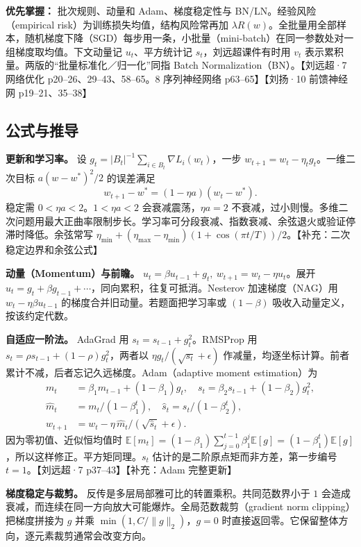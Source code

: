 \documentclass[UTF8,a4paper,zihao=-4,fontset=fandol]{ctexart}
\begin{document}
\textbf{优先掌握：} 批次规则、动量和 Adam、梯度稳定性与 BN/LN。经验风险（empirical risk）为训练损失均值，结构风险常再加 $\lambda R(w)$。全批量用全部样本，随机梯度下降（SGD）每步用一条，小批量（mini-batch）在同一参数处对一组梯度取均值。下文动量记 $u_t$、平方统计记 $s_t$，刘远超课件有时用 $v_t$ 表示累积量。两版的“批量标准化／归一化”同指 Batch Normalization（BN）。【刘远超·7 网络优化 p20--26、29--43、58--65。8 序列神经网络 p63--65】【刘扬·10 前馈神经网 p19--21、35--38】

\subsection{公式与推导}

\textbf{更新和学习率。} 设 $g_t=|B_t|^{-1}\sum_{i\in B_t}\nabla L_i(w_t)$，一步 $w_{t+1}=w_t-\eta_tg_t$。一维二次目标 $a(w-w^*)^2/2$ 的误差满足
\[
 w_{t+1}-w^*=(1-\eta a)(w_t-w^*).
\]
稳定需 $0<\eta a<2$。$1<\eta a<2$ 会衰减震荡，$\eta a=2$ 不衰减，过小则慢。多维二次问题用最大正曲率限制步长。学习率可分段衰减、指数衰减、余弦退火或验证停滞时降低。余弦常写 $\eta_{\min}+(\eta_{\max}-\eta_{\min})(1+\cos(\pi t/T))/2$。【补充：二次稳定边界和余弦公式】

\textbf{动量（Momentum）与前瞻。}
$u_t=\beta u_{t-1}+g_t,\ w_{t+1}=w_t-\eta u_t$。展开 $u_t=g_t+\beta g_{t-1}+\cdots$，同向累积，往复可抵消。Nesterov 加速梯度（NAG）用 $w_t-\eta\beta u_{t-1}$ 的梯度合并旧动量。若题面把学习率或 $(1-\beta)$ 吸收入动量定义，按该约定代数。

\textbf{自适应一阶法。} AdaGrad 用 $s_t=s_{t-1}+g_t^2$。RMSProp 用 $s_t=\rho s_{t-1}+(1-\rho)g_t^2$，两者以 $\eta g_t/(\sqrt{s_t}+\epsilon)$ 作减量，均逐坐标计算。前者累计不减，后者忘记久远梯度。Adam（adaptive moment estimation）为
\begin{align*}
 m_t&=\beta_1 m_{t-1}+(1-\beta_1)g_t,\quad
 s_t=\beta_2 s_{t-1}+(1-\beta_2)g_t^2,\\
 \widehat m_t&=m_t/(1-\beta_1^t),\quad
 \widehat s_t=s_t/(1-\beta_2^t),\\
 w_{t+1}&=w_t-\eta\,\widehat m_t/(\sqrt{\widehat s_t}+\epsilon).
\end{align*}
因为零初值、近似恒均值时 $\mathbb E[m_t]=(1-\beta_1)\sum_{j=0}^{t-1}\beta_1^j\mathbb E[g]=(1-\beta_1^t)\mathbb E[g]$，所以这样修正。平方矩同理。$s_t$ 估计的是二阶原点矩而非方差，第一步编号 $t=1$。【刘远超·7 p37--43】【补充：Adam 完整更新】

\textbf{梯度稳定与裁剪。} 反传是多层局部雅可比的转置乘积。共同范数界小于 $1$ 会造成衰减，而连续在同一方向放大可能爆炸。全局范数裁剪（gradient norm clipping）把梯度拼接为 $g$ 并乘 $\min(1,C/\|g\|_2)$，$g=0$ 时直接返回零。它保留整体方向，逐元素裁剪通常会改变方向。
\end{document}

